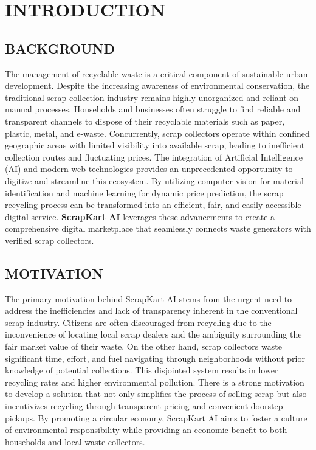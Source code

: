 \chapter{INTRODUCTION}

\section{BACKGROUND}
The management of recyclable waste is a critical component of sustainable urban development. Despite the increasing awareness of environmental conservation, the traditional scrap collection industry remains highly unorganized and reliant on manual processes. Households and businesses often struggle to find reliable and transparent channels to dispose of their recyclable materials such as paper, plastic, metal, and e-waste. Concurrently, scrap collectors operate within confined geographic areas with limited visibility into available scrap, leading to inefficient collection routes and fluctuating prices. The integration of Artificial Intelligence (AI) and modern web technologies provides an unprecedented opportunity to digitize and streamline this ecosystem. By utilizing computer vision for material identification and machine learning for dynamic price prediction, the scrap recycling process can be transformed into an efficient, fair, and easily accessible digital service. \textbf{ScrapKart AI} leverages these advancements to create a comprehensive digital marketplace that seamlessly connects waste generators with verified scrap collectors.

\section{MOTIVATION}
The primary motivation behind ScrapKart AI stems from the urgent need to address the inefficiencies and lack of transparency inherent in the conventional scrap industry. Citizens are often discouraged from recycling due to the inconvenience of locating local scrap dealers and the ambiguity surrounding the fair market value of their waste. On the other hand, scrap collectors waste significant time, effort, and fuel navigating through neighborhoods without prior knowledge of potential collections. This disjointed system results in lower recycling rates and higher environmental pollution. There is a strong motivation to develop a solution that not only simplifies the process of selling scrap but also incentivizes recycling through transparent pricing and convenient doorstep pickups. By promoting a circular economy, ScrapKart AI aims to foster a culture of environmental responsibility while providing an economic benefit to both households and local waste collectors.

